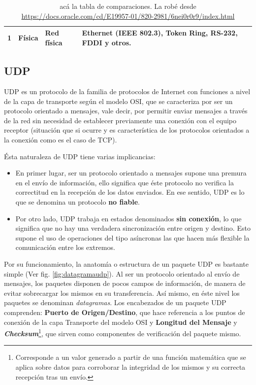\begin{table}[h!]
\begin{tabular}{|c|p{4cm}|l|p{5cm}|}
1                                                                                            & Física                                                                                           & Red física                                & Ethernet (IEEE 802.3), Token Ring, RS-232, FDDI y otros.                                              \\ \hline
\end{tabular}
\caption{acá la tabla de comparaciones. La robé desde \url{https://docs.oracle.com/cd/E19957-01/820-2981/6nei0r0r9/index.html}}
\label{tabla:tcpiposi}
\end{table}


\subsection{UDP}
UDP \cite{rfc:768} es un protocolo de la familia de protocolos de Internet con funciones a nivel de la capa de transporte según el modelo OSI, que se caracteriza por ser un protocolo orientado a mensajes, vale decir, por permitir enviar mensajes a través de la red sin necesidad de establecer previamente una conexión con el equipo receptor (situación que si ocurre y es característica de los protocolos orientados a la conexión como es el caso de TCP).

Ésta naturaleza de UDP tiene varias implicancias:
\begin{itemize}
\item En primer lugar, ser un protocolo orientado a mensajes supone una premura en el envío de información, ello significa que éste protocolo no verifica la correctitud en la recepción de los datos enviados. En ese sentido, UDP es lo que se denomina un protocolo \textbf{no fiable}.
\item Por otro lado, UDP trabaja en estados denominados \textbf{sin conexión}, lo que significa que no hay una verdadera sincronización entre origen y destino. Esto supone el uso de operaciones del tipo asíncronas las que hacen más flexible la comunicación entre los extremos.
\end{itemize}

Por su funcionamiento, la anatomía o estructura de un paquete UDP es bastante simple (Ver fig. \ref{fig:datagramaudp}). Al ser un protocolo orientado al envío de mensajes, los paquetes disponen de pocos campos de información, de manera de evitar sobrecargar los mismos en su transferencia. Así mismo, en éste nivel los paquetes se denominan \emph{datagramas}. Los encabezados de un paquete UDP comprenden: \textbf{Puerto de Origen/Destino}, que hace referencia a los puntos de conexión de la capa Transporte del modelo OSI y \textbf{Longitud del Mensaje} y \textbf{\emph{Checksum}}\footnote{Corresponde a un valor generado a partir de una función matemática que se aplica sobre datos para corroborar la integridad de los mismos y su correcta recepción tras un envío.}, que sirven como componentes de verificación del paquete mismo.

